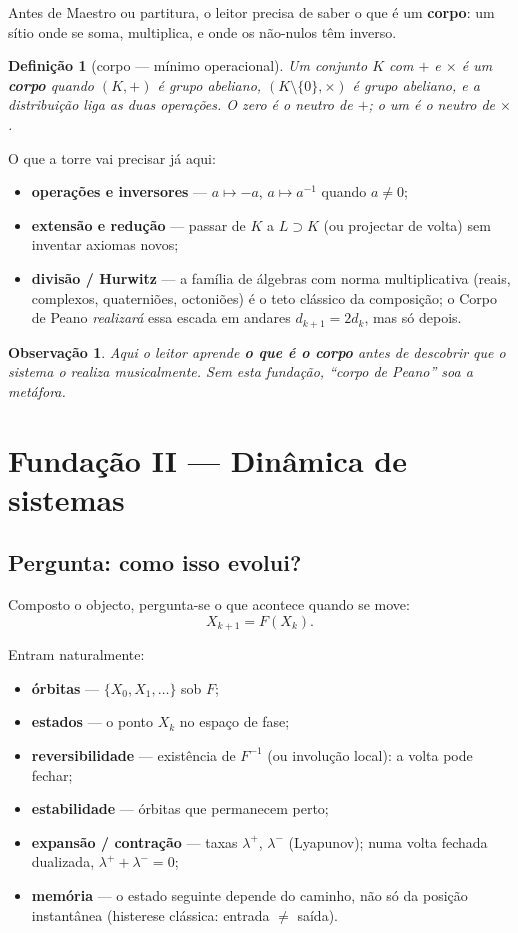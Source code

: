 \documentclass[11pt,a4paper]{article}
\newtheorem{definicao}{Definição}
\newtheorem{observacao}{Observação}
\begin{document}
Antes de Maestro ou partitura, o leitor precisa de saber o que é um
\textbf{corpo}: um sítio onde se soma, multiplica, e onde os não-nulos
têm inverso.

\begin{definicao}[corpo --- mínimo operacional]
Um conjunto $K$ com $+$ e $\times$ é um \textbf{corpo} quando $(K,+)$ é
grupo abeliano, $(K\setminus\{0\},\times)$ é grupo abeliano, e a
distribuição liga as duas operações. O zero é o neutro de $+$; o um é
o neutro de $\times$.
\end{definicao}

\noindent O que a torre vai precisar já aqui:
\begin{itemize}
\item \textbf{operações e inversores} --- $a\mapsto -a$, $a\mapsto a^{-1}$
quando $a\neq0$;
\item \textbf{extensão e redução} --- passar de $K$ a $L\supset K$ (ou
projectar de volta) sem inventar axiomas novos;
\item \textbf{divisão / Hurwitz} --- a família de álgebras com norma
multiplicativa (reais, complexos, quaterniões, octoniões) é o teto
clássico da composição; o Corpo de Peano \emph{realizará} essa escada
em andares $d_{k+1}=2d_k$, mas só depois.
\end{itemize}

\begin{observacao}
Aqui o leitor aprende \textbf{o que é o corpo} antes de descobrir que o
sistema o realiza musicalmente. Sem esta fundação, ``corpo de Peano''
soa a metáfora.
\end{observacao}

\section{Fundação II --- Dinâmica de sistemas}\label{sec:fund-dinamica}
\subsection*{Pergunta: como isso evolui?}

Composto o objecto, pergunta-se o que acontece quando se move:
\[
\boxed{
X_{k+1}=F(X_k).
}
\]

\noindent Entram naturalmente:
\begin{itemize}
\item \textbf{órbitas} --- $\{X_0,X_1,\ldots\}$ sob $F$;
\item \textbf{estados} --- o ponto $X_k$ no espaço de fase;
\item \textbf{reversibilidade} --- existência de $F^{-1}$ (ou involução
local): a volta pode fechar;
\item \textbf{estabilidade} --- órbitas que permanecem perto;
\item \textbf{expansão / contração} --- taxas $\lambda^{+}$, $\lambda^{-}$
(Lyapunov); numa volta fechada dualizada,
$\lambda^{+}+\lambda^{-}=0$;
\item \textbf{memória} --- o estado seguinte depende do caminho, não só
da posição instantânea (histerese clássica: entrada $\neq$ saída).
\end{itemize}
\end{document}

